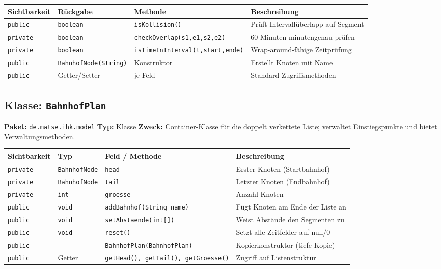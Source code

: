 \documentclass[12pt,a4paper]{article}
\begin{document}
\begin{center}
\small
\begin{tabular}{lllp{5cm}}
\toprule
\textbf{Sichtbarkeit} & \textbf{Rückgabe} & \textbf{Methode} & \textbf{Beschreibung} \\
\midrule
\texttt{public}  & \texttt{boolean} & \texttt{isKollision()} & Prüft Intervallüberlapp auf Segment \\
\texttt{private} & \texttt{boolean} & \texttt{checkOverlap(s1,e1,s2,e2)} & 60 Minuten minutengenau prüfen \\
\texttt{private} & \texttt{boolean} & \texttt{isTimeInInterval(t,start,ende)} & Wrap-around-fähige Zeitprüfung \\
\texttt{public}  & \texttt{BahnhofNode(String)} & Konstruktor & Erstellt Knoten mit Name \\
\texttt{public}  & Getter/Setter & je Feld & Standard-Zugriffsmethoden \\
\bottomrule
\end{tabular}
\end{center}

\subsection{Klasse: \texttt{BahnhofPlan}}

\textbf{Paket:} \texttt{de.matse.ihk.model} \quad
\textbf{Typ:} Klasse \quad
\textbf{Zweck:} Container-Klasse für die doppelt verkettete Liste; verwaltet
Einstiegspunkte und bietet Verwaltungsmethoden.

\begin{center}
\small
\begin{tabular}{lllp{5.5cm}}
\toprule
\textbf{Sichtbarkeit} & \textbf{Typ} & \textbf{Feld / Methode} & \textbf{Beschreibung} \\
\midrule
\texttt{private} & \texttt{BahnhofNode} & \texttt{head} & Erster Knoten (Startbahnhof) \\
\texttt{private} & \texttt{BahnhofNode} & \texttt{tail} & Letzter Knoten (Endbahnhof) \\
\texttt{private} & \texttt{int}         & \texttt{groesse} & Anzahl Knoten \\
\midrule
\texttt{public}  & \texttt{void}        & \texttt{addBahnhof(String name)} & Fügt Knoten am Ende der Liste an \\
\texttt{public}  & \texttt{void}        & \texttt{setAbstaende(int[])} & Weist Abstände den Segmenten zu \\
\texttt{public}  & \texttt{void}        & \texttt{reset()} & Setzt alle Zeitfelder auf null/0 \\
\texttt{public}  &                      & \texttt{BahnhofPlan(BahnhofPlan)} & Kopierkonstruktor (tiefe Kopie) \\
\texttt{public}  & Getter               & \texttt{getHead(), getTail(), getGroesse()} & Zugriff auf Listenstruktur \\
\bottomrule
\end{tabular}
\end{center}
\end{document}
